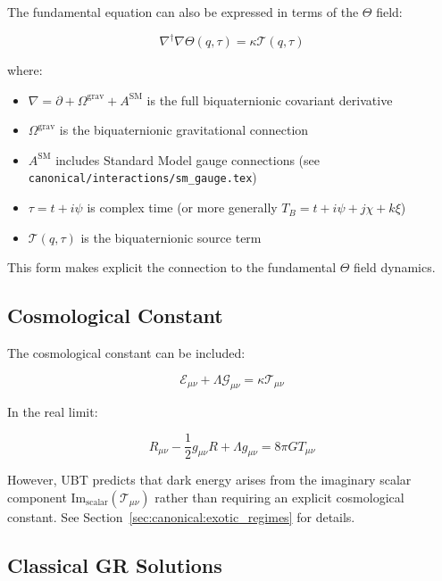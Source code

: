 \documentclass[12pt,a4paper]{article}
\begin{document}
The fundamental equation can also be expressed in terms of the $\Theta$ field:

\begin{equation}
\nabla^\dagger \nabla \Theta(q,\tau) = \kappa \mathcal{T}(q,\tau)
\end{equation}

where:

\begin{itemize}
    \item $\nabla = \partial + \Omega^{\text{grav}} + A^{\text{SM}}$ is the full biquaternionic covariant derivative
    \item $\Omega^{\text{grav}}$ is the biquaternionic gravitational connection
    \item $A^{\text{SM}}$ includes Standard Model gauge connections (see \texttt{canonical/interactions/sm\_gauge.tex})
    \item $\tau = t + i\psi$ is complex time (or more generally $T_B = t + i\psi + j\chi + k\xi$)
    \item $\mathcal{T}(q,\tau)$ is the biquaternionic source term
\end{itemize}

This form makes explicit the connection to the fundamental $\Theta$ field dynamics.

\subsection{Cosmological Constant}

The cosmological constant can be included:

\begin{equation}
\mathcal{E}_{\mu\nu} + \Lambda \mathcal{G}_{\mu\nu}
= \kappa \mathcal{T}_{\mu\nu}
\end{equation}

In the real limit:

\begin{equation}
R_{\mu\nu} - \frac{1}{2} g_{\mu\nu} R + \Lambda g_{\mu\nu} = 8\pi G T_{\mu\nu}
\end{equation}

However, UBT predicts that dark energy arises from the imaginary scalar component $\text{Im}_{\text{scalar}}(\mathcal{T}_{\mu\nu})$ rather than requiring an explicit cosmological constant. See Section~\ref{sec:canonical:exotic_regimes} for details.


\subsection{Classical GR Solutions}
\end{document}
